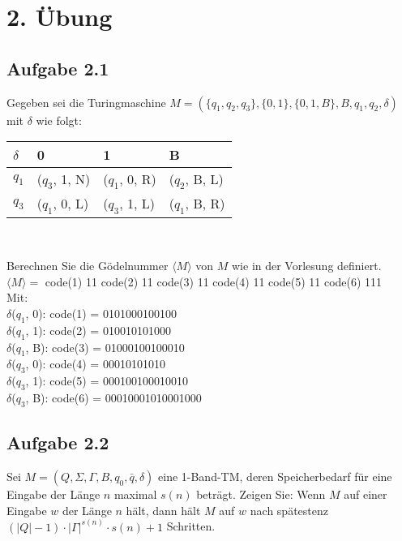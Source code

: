 \section*{2. Übung}
\subsection*{Aufgabe 2.1}
Gegeben sei die Turingmaschine $M=(\{q_1, q_2, q_3\}, \{0,1\}, \{0,1,B\}, B, q_1, q_2, \delta)$ mit $\delta$ wie folgt:
\begin{center}
	\begin{tabular}{l|lll}
		$\delta$ & \hspace{0.6cm}0 & \hspace{0.6cm}1 & \hspace{0.6cm}B \\ \hline
		$q_1$ & ($q_3$, 1, N) & ($q_1$, 0, R) & ($q_2$, B, L) \\
		$q_3$ & ($q_1$, 0, L) & ($q_3$, 1, L) & ($q_1$, B, R)
	\end{tabular}\\
\end{center}
Berechnen Sie die Gödelnummer $\langle M \rangle$ von $M$ wie in der Vorlesung definiert.
\\

$\langle M \rangle = $ code(1) 11 code(2) 11 code(3) 11 code(4) 11 code(5) 11 code(6) 111
\\

Mit:
\\
$\delta$($q_{1}$, 0): code(1) = 0101000100100
\\
$\delta$($q_{1}$, 1): code(2) = 010010101000
\\
$\delta$($q_{1}$, B): code(3) = 01000100100010
\\
$\delta$($q_{3}$, 0): code(4) = 00010101010
\\
$\delta$($q_{3}$, 1): code(5) = 000100100010010
\\
$\delta$($q_{3}$, B): code(6) = 00010001010001000
\\


\subsection*{Aufgabe 2.2}
Sei $M = (Q, \Sigma, \Gamma, B, q_0, \bar{q}, \delta)$ eine 1-Band-TM, deren Speicherbedarf für eine Eingabe der Länge $n$ maximal $s(n)$ beträgt. Zeigen Sie: Wenn $M$ auf einer Eingabe $w$ der Länge $n$ hält, dann hält $M$ auf $w$ nach spätestenz $(\left| Q\right| -1) \cdot \left| \Gamma\right|^{s(n)} \cdot s(n)+1$ Schritten.\\\\

